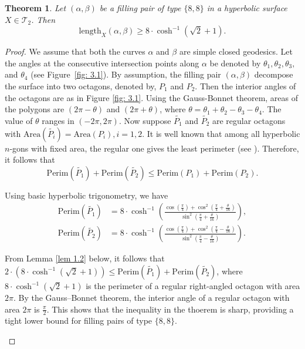 \documentclass[11pt,reqno]{amsart}
\theoremstyle{plain}
\newtheorem{theorem}{Theorem}[section]
\theoremstyle{definition}
\theoremstyle{remark}
\numberwithin{equation}{section}
\numberwithin{figure}{section}
\begin{document}
\begin{theorem}\label{thm: length}
    Let $(\alpha, \beta)$ be a filling pair of type $\{8,8\}$ in a hyperbolic surface $X\in \mathcal{T}_2$. Then
    $$\mathrm{length}_X(\alpha,\beta) \geq 8\cdot\cosh^{-1}\left(\sqrt{2}+1\right).$$
\end{theorem}
\begin{proof}
    We assume that both the curves $\alpha$ and $\beta$ are simple closed geodesics. Let the angles at the consecutive intersection points along $\alpha$ be denoted by $\theta_1, \theta_2, \theta_3,$ and $\theta_4$ (see Figure~\ref{fig: 3.1}). By assumption, the filling pair $(\alpha,\beta)$ decompose the surface into two octagons, denoted by, $P_1$ and $P_2$. Then the interior angles of the octagons are as in Figure \ref{fig: 3.1}. Using the Gauss-Bonnet theorem, areas of the polygons are $(2\pi-\theta)$ and $(2\pi+\theta)$, where $\theta=\theta_1+\theta_2-\theta_3-\theta_4$. The value of $\theta$ ranges in $(-2\pi,2\pi)$. Now suppose $\tilde{P_1}$ and $\tilde{P_2}$ are regular octagons with $\mathrm{Area}(\tilde{P_i})=\mathrm{Area}(P_i), i=1,2$. It is well known that among all hyperbolic $n$-gons with fixed area, the regular one gives the least perimeter (see \cite{Bezdek}). Therefore, it follows that
    $$\mathrm{Perim}(\tilde{P_1})+\mathrm{Perim}(\tilde{P_2})\leq \mathrm{Perim}(P_1)+\mathrm{Perim}(P_2).$$

    Using basic hyperbolic trigonometry, we have
    \begin{align*}
        \mathrm{Perim}(\tilde{P_1})&=8 \cdot \cosh^{-1}\left(\frac{\cos\left(\frac{\pi}{4}\right)+\cos^2\left(\frac{\pi}{4}+\frac{\theta}{16}\right)}{\sin^2\left(\frac{\pi}{4}+\frac{\theta}{16}\right)}\right),\\
        \mathrm{Perim}(\tilde{P_2})&=8\cdot \cosh^{-1}\left(\frac{\cos\left(\frac{\pi}{4}\right)+\cos^2\left(\frac{\pi}{4}-\frac{\theta}{16}\right)}{\sin^2\left(\frac{\pi}{4}-\frac{\theta}{16}\right)}\right).
    \end{align*}

    From Lemma \ref{lem 1.2} below, it follows that $2\cdot (8 \cdot \cosh^{-1}(\sqrt{2}+1))\leq \mathrm{Perim}(\tilde{P_1})+\mathrm{Perim}(\tilde{P_2})$, where $8 \cdot \cosh^{-1}(\sqrt{2}+1)$ is the perimeter of a regular right-angled octagon with area $2\pi$. By the Gauss–Bonnet theorem, the interior angle of a regular octagon with area $2\pi$ is $\frac{\pi}{2}$. This shows that the inequality in the thoerem is sharp, providing a tight lower bound for filling pairs of type $\{8,8\}$.
    \begin{figure}[htbp]
        \centering
\end{figure}
\end{proof}
\end{document}
